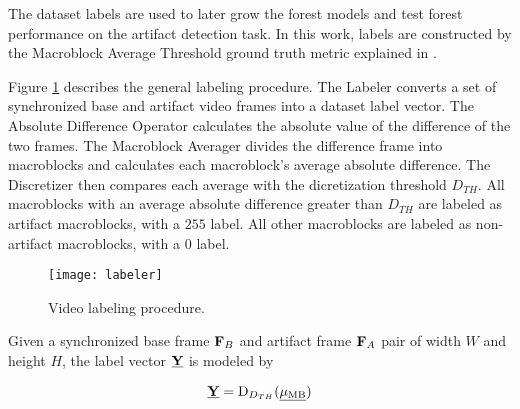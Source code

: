 The dataset labels are used to later grow the forest models and test forest performance on the artifact detection task.  In this work, labels are constructed by the Macroblock Average Threshold ground truth metric explained in \cite{Brenes2022}.

Figure \ref{fig:labeler} describes the general labeling procedure. The Labeler converts a set of synchronized base and artifact video frames into a dataset label vector. The Absolute Difference Operator calculates the absolute value of the difference of the two frames. The Macroblock Averager divides the difference frame into macroblocks and calculates each macroblock's average absolute difference. The Discretizer then compares each average with the dicretization threshold $D_{TH}$. All macroblocks with an average absolute difference greater than $D_{TH}$ are labeled as artifact macroblocks, with a $255$ label. All other macroblocks are labeled as non-artifact macroblocks, with a $0$ label.

\begin{figure} [!h]
  \centering
  
  \texttt{[image: labeler]}
  
  \caption{Video labeling procedure.}
  \label{fig:labeler}

\end{figure}
 
\def\FA{\mat{F}_A}
\def\FB{\mat{F}_B}

Given a synchronized base frame $\FB$ and artifact frame $\FA$ pair of width $W$ and height $H$, the label vector $\underline{\mathbf{Y}}$ is modeled by

\def\ADO{\text{ADO}}
\def\MA{\text{MA}}
\def\D{\text{D}_{D_{TH}}}
\def\d{\text{d}_{D_{TH}}}
\def\MU{\mu_{\text{MB}}}
\def\VMU{\vct{\mu_{\text{MB}}}}
\begin{equation}
  \label{eq:Y}
  \vct{Y} = \D(\VMU)
\end{equation}

